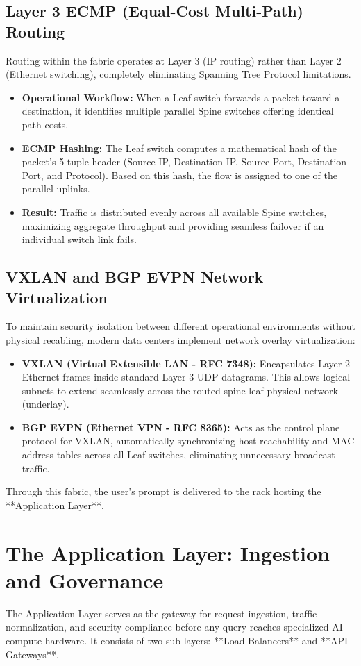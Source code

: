 \documentclass[12pt,a4paper]{report}
\begin{document}
\subsection{Layer 3 ECMP (Equal-Cost Multi-Path) Routing}
Routing within the fabric operates at Layer 3 (IP routing) rather than Layer 2 (Ethernet switching), completely eliminating Spanning Tree Protocol limitations.
\begin{itemize}[leftmargin=1.2cm]
    \item \textbf{Operational Workflow:} When a Leaf switch forwards a packet toward a destination, it identifies multiple parallel Spine switches offering identical path costs.
    \item \textbf{ECMP Hashing:} The Leaf switch computes a mathematical hash of the packet's 5-tuple header (Source IP, Destination IP, Source Port, Destination Port, and Protocol). Based on this hash, the flow is assigned to one of the parallel uplinks.
    \item \textbf{Result:} Traffic is distributed evenly across all available Spine switches, maximizing aggregate throughput and providing seamless failover if an individual switch link fails.
\end{itemize}

\subsection{VXLAN and BGP EVPN Network Virtualization}
To maintain security isolation between different operational environments without physical recabling, modern data centers implement network overlay virtualization:
\begin{itemize}[leftmargin=1.2cm]
    \item \textbf{VXLAN (Virtual Extensible LAN - RFC 7348):} Encapsulates Layer 2 Ethernet frames inside standard Layer 3 UDP datagrams. This allows logical subnets to extend seamlessly across the routed spine-leaf physical network (underlay).
    \item \textbf{BGP EVPN (Ethernet VPN - RFC 8365):} Acts as the control plane protocol for VXLAN, automatically synchronizing host reachability and MAC address tables across all Leaf switches, eliminating unnecessary broadcast traffic.
\end{itemize}

Through this fabric, the user's prompt is delivered to the rack hosting the **Application Layer**.

\section{The Application Layer: Ingestion and Governance}
The Application Layer serves as the gateway for request ingestion, traffic normalization, and security compliance before any query reaches specialized AI compute hardware. It consists of two sub-layers: **Load Balancers** and **API Gateways**.
\end{document}
